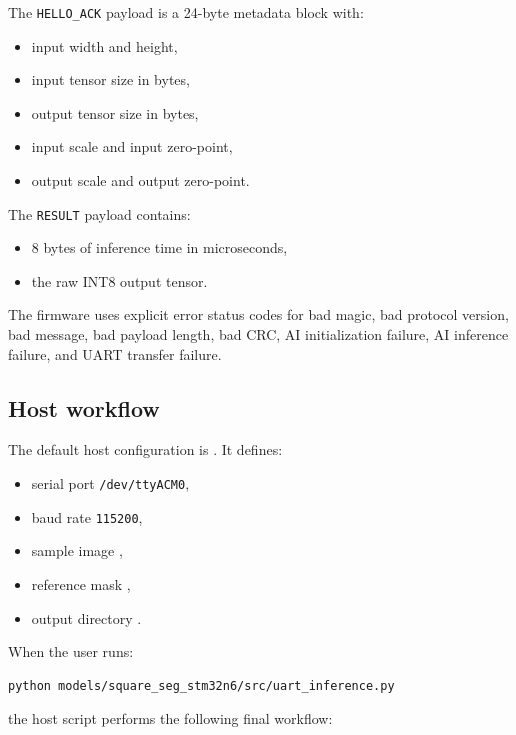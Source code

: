 \documentclass[11pt,a4paper]{article}
\begin{document}
The \texttt{HELLO\_ACK} payload is a 24-byte metadata block with:

\begin{itemize}
\item input width and height,
\item input tensor size in bytes,
\item output tensor size in bytes,
\item input scale and input zero-point,
\item output scale and output zero-point.
\end{itemize}

The \texttt{RESULT} payload contains:

\begin{itemize}
\item 8 bytes of inference time in microseconds,
\item the raw INT8 output tensor.
\end{itemize}

The firmware uses explicit error status codes for bad magic, bad protocol version, bad
message, bad payload length, bad CRC, AI initialization failure, AI inference failure,
and UART transfer failure.

\subsection{Host workflow}

The default host configuration is
. It defines:

\begin{itemize}
\item serial port \texttt{/dev/ttyACM0},
\item baud rate \texttt{115200},
\item sample image ,
\item reference mask ,
\item output directory .
\end{itemize}

When the user runs:

\begin{lstlisting}[language=bash]
python models/square_seg_stm32n6/src/uart_inference.py
\end{lstlisting}

the host script performs the following final workflow:
\end{document}
